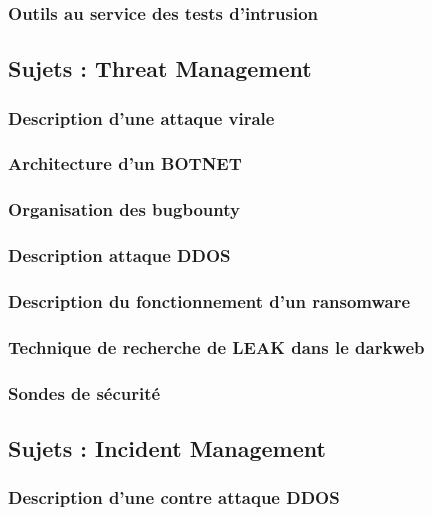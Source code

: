 \subsubsection{Outils au service des tests d'intrusion}

\subsection{Sujets : Threat Management}
\subsubsection{Description d'une attaque virale}
\subsubsection{Architecture d'un BOTNET}
\subsubsection{Organisation des bugbounty}
\subsubsection{Description attaque DDOS}
\subsubsection{Description du fonctionnement d'un ransomware}
\subsubsection{Technique de recherche de LEAK dans le darkweb}

\subsubsection{Sondes de sécurité}

\subsection{Sujets : Incident Management}
\subsubsection{Description d'une contre attaque DDOS}
